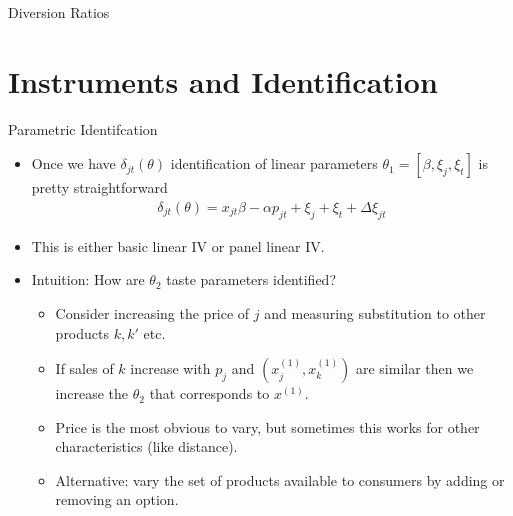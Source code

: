 \documentclass[aspectratio=169,10pt]{beamer}
\begin{document}
\begin{frame}{Diversion Ratios}
\begin{center}
\scalebox{0.6}{

}
\end{center}
\end{frame}


\section{Instruments and Identification}

\begin{frame}{Parametric Identifcation}
\begin{itemize}
\item Once we have $\delta_{jt}(\theta)$ identification of linear parameters $\theta_1=[\beta,\xi_j, \xi_t]$ is pretty straightforward
\begin{eqnarray*}
\delta_{jt}(\theta) = x_{jt} \beta - \alpha p_{jt} + \xi_j + \xi_t + \Delta \xi_{jt}
\end{eqnarray*}
\item This is either basic linear IV or panel linear IV.
\item Intuition: How are $\theta_2$ taste parameters identified?
\begin{itemize}
\item Consider increasing the price of $j$ and measuring substitution to other products $k,k'$ etc.
\item If sales of $k$ increase with $p_j$ and $(x_j^{(1)},x_k^{(1)})$ are similar then we increase the $\theta_2$ that corresponds to $x^{(1)}$.
\item Price is the most obvious to vary, but sometimes this works for other characteristics (like distance).
\item Alternative: vary the set of products available to consumers by adding or removing an option.
\end{itemize}
\end{itemize}
\end{frame}
\end{document}
